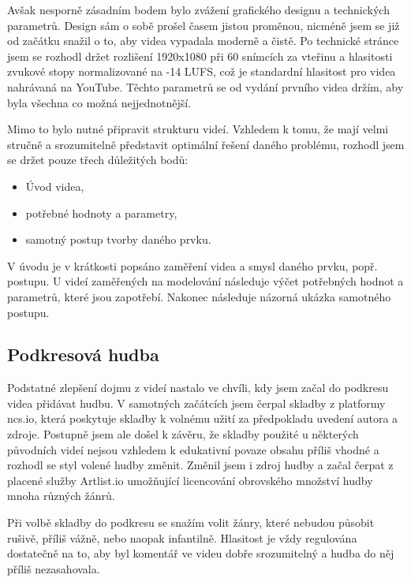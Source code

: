 Avšak nesporně zásadním bodem bylo zvážení grafického designu a technických parametrů.
Design sám o sobě prošel časem jistou proměnou, nicméně jsem se již od začátku snažil o to, aby videa vypadala moderně a čistě.
Po technické stránce jsem se rozhodl držet rozlišení 1920x1080 při 60 snímcích za vteřinu a hlasitosti zvukové stopy normalizované na -14 LUFS, což je standardní hlasitost pro videa nahrávaná na YouTube.
Těchto parametrů se od vydání prvního videa držím, aby byla všechna co možná nejjednotnější.

Mimo to bylo nutné připravit strukturu videí.
Vzhledem k tomu, že mají velmi stručně a srozumitelně představit optimální řešení daného problému, rozhodl jsem se držet pouze třech důležitých bodů:
\begin{itemize}[topsep=0pt]
    \setlength\itemsep{0em}
    \item Úvod videa,
    \item potřebné hodnoty a parametry,
    \item samotný postup tvorby daného prvku.
\end{itemize}
V úvodu je v krátkosti popsáno zaměření videa a smysl daného prvku, popř. postupu.
U videí zaměřených na modelování následuje výčet potřebných hodnot a parametrů, které jsou zapotřebí.
Nakonec následuje názorná ukázka samotného postupu.

\subsection{Podkresová hudba}
Podstatné zlepšení dojmu z videí nastalo ve chvíli, kdy jsem začal do podkresu videa přidávat hudbu.
V samotných začátcích jsem čerpal skladby z platformy ncs.io, která poskytuje skladby k volnému užití za předpokladu uvedení autora a zdroje.
Postupně jsem ale došel k závěru, že skladby použité u některých původních videí nejsou vzhledem k edukativní povaze obsahu příliš vhodné a rozhodl se styl volené hudby změnit. 
Změnil jsem i zdroj hudby a začal čerpat z placené služby Artlist.io umožňující licencování obrovského množství hudby mnoha různých žánrů.

Při volbě skladby do podkresu se snažím volit žánry, které nebudou působit rušivě, příliš vážně, nebo naopak infantilně.
Hlasitost je vždy regulována dostatečně na to, aby byl komentář ve videu dobře srozumitelný a hudba do něj příliš nezasahovala.

